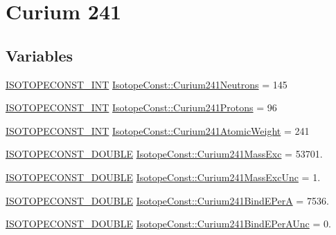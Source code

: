 \hypertarget{group___isotope_const-_curium-_cm241}{}\section{Curium 241}
\label{group___isotope_const-_curium-_cm241}
\subsection*{Variables}
\begin{DoxyCompactItemize}
\item 
\mbox{\hyperlink{group___isotope_const-_macros_ga5f18360b3e99483a35c32d789e62621c}{I\+S\+O\+T\+O\+P\+E\+C\+O\+N\+S\+T\+\_\+\+I\+NT}} \mbox{\hyperlink{group___isotope_const-_curium-_cm241_gaa79a946782931780e9ce6164375d911a}{Isotope\+Const\+::\+Curium241\+Neutrons}} = 145
\item 
\mbox{\hyperlink{group___isotope_const-_macros_ga5f18360b3e99483a35c32d789e62621c}{I\+S\+O\+T\+O\+P\+E\+C\+O\+N\+S\+T\+\_\+\+I\+NT}} \mbox{\hyperlink{group___isotope_const-_curium-_cm241_gaf6973110c80fd516fa2355cd50f2858f}{Isotope\+Const\+::\+Curium241\+Protons}} = 96
\item 
\mbox{\hyperlink{group___isotope_const-_macros_ga5f18360b3e99483a35c32d789e62621c}{I\+S\+O\+T\+O\+P\+E\+C\+O\+N\+S\+T\+\_\+\+I\+NT}} \mbox{\hyperlink{group___isotope_const-_curium-_cm241_gad0bbeb3d22854b5e82982a62d948f71d}{Isotope\+Const\+::\+Curium241\+Atomic\+Weight}} = 241
\item 
\mbox{\hyperlink{group___isotope_const-_macros_ga8f45a7272ce02c0b4c65c44636ed719a}{I\+S\+O\+T\+O\+P\+E\+C\+O\+N\+S\+T\+\_\+\+D\+O\+U\+B\+LE}} \mbox{\hyperlink{group___isotope_const-_curium-_cm241_ga9b03c7cfd2e46b35314d76c558da22f1}{Isotope\+Const\+::\+Curium241\+Mass\+Exc}} = 53701.
\item 
\mbox{\hyperlink{group___isotope_const-_macros_ga8f45a7272ce02c0b4c65c44636ed719a}{I\+S\+O\+T\+O\+P\+E\+C\+O\+N\+S\+T\+\_\+\+D\+O\+U\+B\+LE}} \mbox{\hyperlink{group___isotope_const-_curium-_cm241_ga70083179f7897a59c72be5bd90fc7120}{Isotope\+Const\+::\+Curium241\+Mass\+Exc\+Unc}} = 1.
\item 
\mbox{\hyperlink{group___isotope_const-_macros_ga8f45a7272ce02c0b4c65c44636ed719a}{I\+S\+O\+T\+O\+P\+E\+C\+O\+N\+S\+T\+\_\+\+D\+O\+U\+B\+LE}} \mbox{\hyperlink{group___isotope_const-_curium-_cm241_ga8afba82ea760bb2797b6a8f96f14b071}{Isotope\+Const\+::\+Curium241\+Bind\+E\+PerA}} = 7536.
\item 
\mbox{\hyperlink{group___isotope_const-_macros_ga8f45a7272ce02c0b4c65c44636ed719a}{I\+S\+O\+T\+O\+P\+E\+C\+O\+N\+S\+T\+\_\+\+D\+O\+U\+B\+LE}} \mbox{\hyperlink{group___isotope_const-_curium-_cm241_gaec421d7c001fb118d0214f36f9305e51}{Isotope\+Const\+::\+Curium241\+Bind\+E\+Per\+A\+Unc}} = 0.

\end{DoxyCompactItemize}
